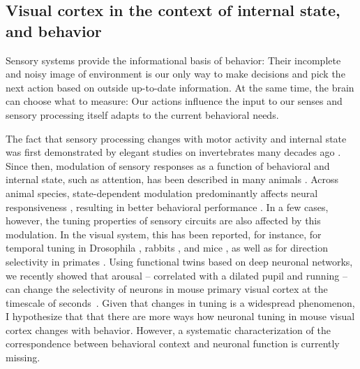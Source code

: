 \documentclass[B2,COG]{ercgrant}
\begin{document}



\subsection{Visual cortex in the context of internal state, and behavior}


Sensory systems provide the informational basis of behavior: Their incomplete and noisy image of environment is our only way to make decisions and pick the next action based on outside up-to-date information. 
At the same time, the brain can choose what to measure: Our actions influence the input to our senses and sensory processing itself adapts to the current behavioral needs. 

The fact that sensory processing changes with motor activity and internal state was first demonstrated by elegant studies on invertebrates many decades ago  \parencite{Rowell1971-zj, Wiersma1968-xt}.
Since then, modulation of sensory responses as a function of behavioral and internal state, such as attention, has been described in many animals \parencite[\eg][]{Maimon2010-sa, Niell2010-bs,Bezdudnaya2006-ge, Treue1996-lp, Musall2019-kd}.
Across animal species, state-dependent modulation predominantly affects neural responsiveness \parencite{Eggermann2014-xp, Niell2010-bs, McAdams1999-cs,Schroder2020-jl, Dadarlat2017-jw, Mineault2016-fk}, resulting in better behavioral performance \parencite{Spitzer1988-kq, Bennett2013-rk, Dadarlat2017-jw, De_Gee2022-ir}.
In a few cases, however, the tuning properties of sensory circuits are also affected by this modulation. 
In the visual system, this has been reported, for instance, for temporal tuning in Drosophila \parencite{Chiappe2010-bm}, rabbits \parencite{Bezdudnaya2006-ge}, and mice \parencite{Andermann2011-vw}, as well as for direction selectivity in primates \parencite{Treue1996-lp}.
Using functional twins based on deep neuronal networks, we recently showed that arousal -- correlated with a dilated pupil and running -- can change the selectivity of neurons in mouse primary visual cortex at the timescale of seconds~\parencite{Franke2022-do}. 
Given that changes in tuning is a widespread phenomenon, I hypothesize that  that there are more ways how neuronal tuning in mouse visual cortex changes with behavior. 
However, a systematic characterization of the correspondence between behavioral context and neuronal function is currently missing. 
\end{document}
